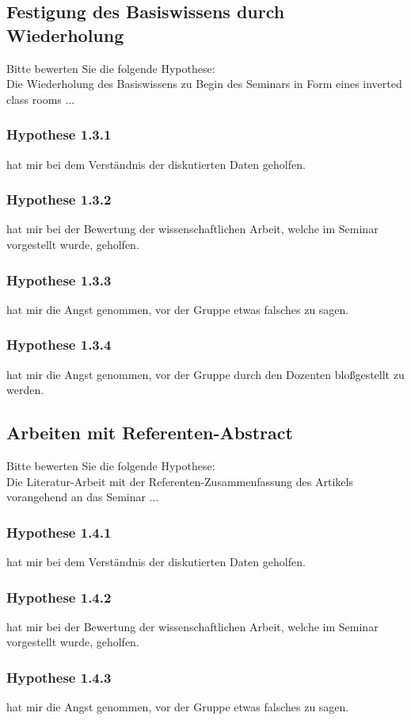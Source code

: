 \subsection*{Festigung des Basiswissens durch Wiederholung}
Bitte bewerten Sie die folgende Hypothese:\\
\noindent
Die Wiederholung des Basiswissens zu Begin des Seminars in Form eines inverted class rooms ...
\subsubsection*{Hypothese 1.3.1}
hat mir bei dem Verständnis der diskutierten Daten geholfen.
\subsubsection*{Hypothese 1.3.2}
hat mir bei der Bewertung der wissenschaftlichen Arbeit, welche im Seminar vorgestellt wurde, geholfen.
\subsubsection*{Hypothese 1.3.3}
hat mir die Angst genommen, vor der Gruppe etwas falsches zu sagen.
\subsubsection*{Hypothese 1.3.4}
hat mir die Angst genommen, vor der Gruppe durch den Dozenten bloßgestellt zu werden.


\subsection*{Arbeiten mit Referenten-Abstract}
Bitte bewerten Sie die folgende Hypothese:\\
\noindent
Die Literatur-Arbeit mit der Referenten-Zusammenfassung des Artikels vorangehend an das Seminar ...
\subsubsection*{Hypothese 1.4.1}
hat mir bei dem Verständnis der diskutierten Daten geholfen.
\subsubsection*{Hypothese 1.4.2}
hat mir bei der Bewertung der wissenschaftlichen Arbeit, welche im Seminar vorgestellt wurde, geholfen.
\subsubsection*{Hypothese 1.4.3}
hat mir die Angst genommen, vor der Gruppe etwas falsches zu sagen.

